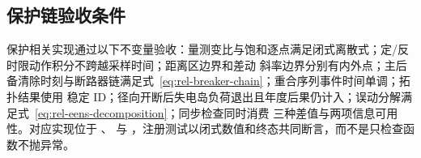 \subsection{保护链验收条件}
保护相关实现通过以下不变量验收：量测变比与饱和逐点满足闭式离散式；定/反时限动作积分不跨越采样时间；距离区边界和差动
斜率边界分别有内外点；主后备清除时刻与断路器链满足式~\eqref{eq:rel-breaker-chain}；重合序列事件时间单调；拓扑结果使用
稳定 ID；径向开断后失电岛负荷退出且年度后果仍计入；误动分解满足式~\eqref{eq:rel-eens-decomposition}；同步检查同时消费
三种差值与两项信息可用性。对应实现位于 、
 与
，注册测试以闭式数值和终态共同断言，而不是只检查函数不抛异常。
